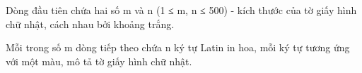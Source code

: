 Dòng đầu tiên chứa hai số m và n (1 ≤ m, n ≤ 500) - kích thước của tờ giấy hình chữ nhật, cách nhau bởi khoảng trắng.  

   Mỗi trong số m dòng tiếp theo chứa n ký tự Latin in hoa, mỗi ký tự tương ứng với một màu, mô tả tờ giấy hình chữ nhật.  

\